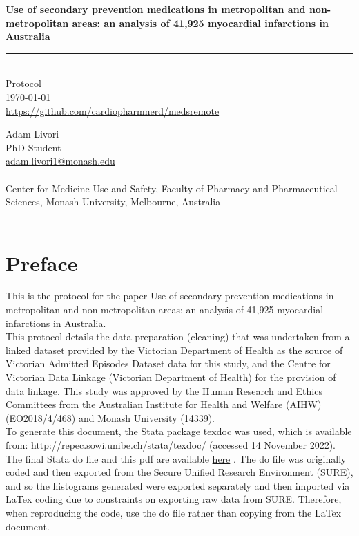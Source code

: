 \documentclass[11pt]{article}
\newcommand{\thedate}{\today}
\begin{document}
\begin{titlepage}
  \begin{flushright}
        \Huge
        \textbf{Use of secondary prevention medications in metropolitan and non-metropolitan areas: an analysis of 41,925  myocardial infarctions in Australia}
\color{violet}
\rule{16cm}{2mm} \\
\Large
\color{black}
Protocol \\
\thedate \\
\color{blue}
\url{https://github.com/cardiopharmnerd/medsremote} \\
\color{black}
       \vfill
    \end{flushright}
        \Large

\noindent
Adam Livori \\
PhD Student \\
\color{blue}
\href{mailto:adam.livori1@Monash.edu}{adam.livori1@monash.edu} \\ 
\color{black}
\\
Center for Medicine Use and Safety, Faculty of Pharmacy and Pharmaceutical Sciences, Monash University, Melbourne, Australia \\
\\
\end{titlepage}

\pagebreak
\tableofcontents
\pagebreak
\listoffigures
\pagebreak

\pagebreak
\section{Preface}

This is the protocol for the paper Use of secondary prevention medications in metropolitan and non-metropolitan areas: an analysis of 41,925 myocardial infarctions in Australia. \\
This protocol details the data preparation (cleaning) that was undertaken from a linked dataset provided by the Victorian Department of Health as the source of Victorian Admitted Episodes Dataset data for this study, and the Centre for Victorian Data Linkage (Victorian Department of Health) for the provision of data linkage. This study was approved by the Human Research and Ethics Committees from the Australian Institute for Health and Welfare (AIHW) (EO2018/4/468) and Monash University (14339). \\
To generate this document, the Stata package texdoc was used, which is available from: \color{blue} \url{http://repec.sowi.unibe.ch/stata/texdoc/} \color{black} (accessed 14 November 2022). The final Stata do file and this pdf are available \color{blue} \href{https://github.com/cardiopharmnerd/medsremote}{here} \color{black}. The do file was originally coded and then exported from the Secure Unified Research Environment (SURE), and so the histograms generated were exported separately and then imported via LaTex coding due to constraints on exporting raw data from SURE. Therefore, when reproducing the code, use the do file rather than copying from the LaTex document. 
\end{document}
